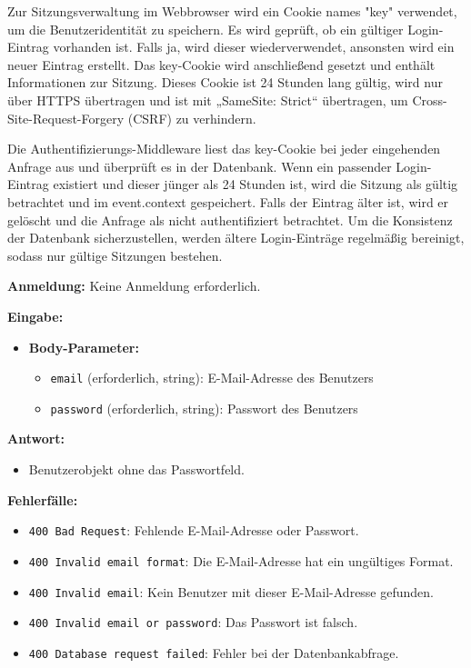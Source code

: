 \documentclass[a4paper,12pt]{article}
\begin{document}
Zur Sitzungsverwaltung im Webbrowser wird ein Cookie names "key" verwendet, um
die Benutzeridentität zu speichern. Es wird geprüft, ob ein gültiger
Login-Eintrag vorhanden ist. Falls ja, wird dieser wiederverwendet, ansonsten
wird ein neuer Eintrag erstellt. Das key-Cookie wird anschließend gesetzt und
enthält Informationen zur Sitzung.  Dieses Cookie ist 24 Stunden lang gültig,
wird nur über HTTPS übertragen und ist mit „SameSite: Strict“ übertragen, um
Cross-Site-Request-Forgery (CSRF) zu verhindern.

Die Authentifizierungs-Middleware liest das key-Cookie bei jeder eingehenden
Anfrage aus und überprüft es in der Datenbank. Wenn ein passender Login-Eintrag
existiert und dieser jünger als 24 Stunden ist, wird die Sitzung als gültig
betrachtet und im event.context gespeichert. Falls der Eintrag älter ist, wird
er gelöscht und die Anfrage als nicht authentifiziert betrachtet. Um die
Konsistenz der Datenbank sicherzustellen, werden ältere Login-Einträge
regelmäßig bereinigt, sodass nur gültige Sitzungen bestehen.

\textbf{Anmeldung:} Keine Anmeldung erforderlich.

\textbf{Eingabe:}
\begin{itemize}
    \item \textbf{Body-Parameter:}
    \begin{itemize}
        \item \texttt{email} (erforderlich, string):
            E-Mail-Adresse des Benutzers
        \item \texttt{password} (erforderlich, string):
            Passwort des Benutzers
    \end{itemize}
\end{itemize}

\textbf{Antwort:}
\begin{itemize}
    \item Benutzerobjekt ohne das Passwortfeld.
\end{itemize}

\textbf{Fehlerfälle:}
\begin{itemize}
    \item \texttt{400 Bad Request}:
        Fehlende E-Mail-Adresse oder Passwort.
    \item \texttt{400 Invalid email format}:
        Die E-Mail-Adresse hat ein ungültiges Format.
    \item \texttt{400 Invalid email}:
        Kein Benutzer mit dieser E-Mail-Adresse gefunden.
    \item \texttt{400 Invalid email or password}:
        Das Passwort ist falsch.
    \item \texttt{400 Database request failed}:
        Fehler bei der Datenbankabfrage.
\end{itemize}
\end{document}
